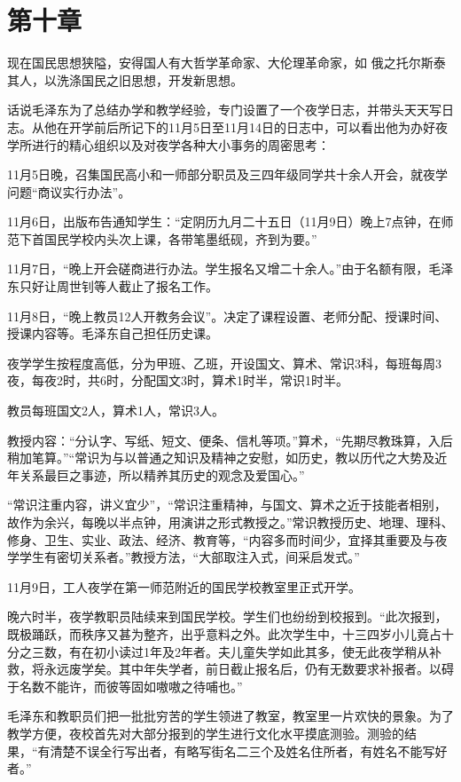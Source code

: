 \documentclass[../../dazhuan.tex]{subfiles}
\begin{document}
\chapter*{第十章}
\begin{pref}
	现在国民思想狭隘，安得国人有大哲学革命家、大伦理革命家，如	
俄之托尔斯泰其人，以洗涤国民之旧思想，开发新思想。
\end{pref}

话说毛泽东为了总结办学和教学经验，专门设置了一个夜学日志，并带头天天写日志。从他在开学前后所记下的11月5日至11月14日的日志中，可以看出他为办好夜学所进行的精心组织以及对夜学各种大小事务的周密思考：

11月5日晚，召集国民高小和一师部分职员及三四年级同学共十余人开会，就夜学问题“商议实行办法”。

11月6日，出版布告通知学生：“定阴历九月二十五日（11月9日）晚上7点钟，在师范下首国民学校内头次上课，各带笔墨纸砚，齐到为要。”

11月7日，“晚上开会磋商进行办法。学生报名又增二十余人。”由于名额有限，毛泽东只好让周世钊等人截止了报名工作。

11月8日，“晚上教员12人开教务会议”。决定了课程设置、老师分配、授课时间、授课内容等。毛泽东自己担任历史课。

夜学学生按程度高低，分为甲班、乙班，开设国文、算术、常识3科，每班每周3夜，每夜2时，共6时，分配国文3时，算术1时半，常识1时半。

教员每班国文2人，算术1人，常识3人。

教授内容：“分认字、写纸、短文、便条、信札等项。”算术，“先期尽教珠算，入后稍加笔算。”“常识为与以普通之知识及精神之安慰，如历史，教以历代之大势及近年关系最巨之事迹，所以精养其历史的观念及爱国心。”

“常识注重内容，讲义宜少”，“常识注重精神，与国文、算术之近于技能者相别，故作为余兴，每晚以半点钟，用演讲之形式教授之。”常识教授历史、地理、理科、修身、卫生、实业、政法、经济、教育等，“内容多而时间少，宜择其重要及与夜学学生有密切关系者。”教授方法，“大部取注入式，间采启发式。”

11月9日，工人夜学在第一师范附近的国民学校教室里正式开学。

晚六时半，夜学教职员陆续来到国民学校。学生们也纷纷到校报到。“此次报到，既极踊跃，而秩序又甚为整齐，出乎意料之外。此次学生中，十三四岁小儿竟占十分之三数，有在初小读过1年及2年者。夫儿童失学如此其多，使无此夜学稍从补救，将永远废学矣。其中年失学者，前日截止报名后，仍有无数要求补报者。以碍于名数不能许，而彼等固如嗷嗷之待哺也。”

毛泽东和教职员们把一批批穷苦的学生领进了教室，教室里一片欢快的景象。为了教学方便，夜校首先对大部分报到的学生进行文化水平摸底测验。测验的结果，“有清楚不误全行写出者，有略写街名二三个及姓名住所者，有姓名不能写好者。”
\end{document}
